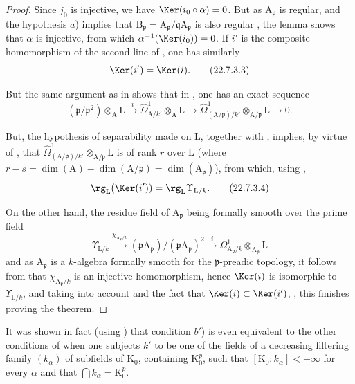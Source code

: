 \begin{proof}
Since $j_0$ is injective, we have $\Ker(i_0\circ\alpha)=0$.
But as $\mathrm{A}_\mathfrak{p}$ is regular, and the hypothesis $a$) implies that $\mathrm{B}_\mathfrak{p}=\mathrm{A}_\mathfrak{p}/\mathfrak{q}\mathrm{A}_\mathfrak{p}$ is also regular , the lemma  shows that $\alpha$ is injective, from which $\alpha^{-1}(\Ker(i_0))=0$.
If $i'$ is the composite homomorphism of the second line of , one has similarly
\[
\label{0.22.7.3.3}
  \Ker(i')=\Ker(i).
  \tag{22.7.3.3}
\]

But the same argument as in  shows that in , one has an exact sequence
\[
  (\mathfrak{p}/\mathfrak{p}^2)\otimes_\mathrm{A}\mathrm{L}\xrightarrow{i}\widehat{\Omega}^1_{\mathrm{A}/k'}\otimes_\mathrm{A}\mathrm{L}\to\widehat{\Omega}^1_{(\mathrm{A}/\mathfrak{p})/k'}\otimes_{\mathrm{A}/\mathfrak{p}}\mathrm{L}\to 0.
\]

But, the hypothesis of separability made on $\mathrm{L}$, together with , implies, by virtue of , that $\widehat{\Omega}^1_{(\mathrm{A}/\mathfrak{p})/k'}\otimes_{\mathrm{A}/\mathfrak{p}}\mathrm{L}$ is of rank $r$ over $\mathrm{L}$ (where $r-s=\dim(\mathrm{A})-\dim(\mathrm{A}/\mathfrak{p})=\dim(\mathrm{A}_\mathfrak{p})$), from which, using ,
\[
\label{0.22.7.3.4}
  \rg_\mathrm{L}(\Ker(i'))=\rg_\mathrm{L}\Upsilon_{\mathrm{L}/k}.
  \tag{22.7.3.4}
\]

On the other hand, the residue field of $\mathrm{A}_\mathfrak{p}$ being formally smooth over the prime field 
\[
  \Upsilon_{\mathrm{L}/k}\xrightarrow{\chi_{\mathrm{A}_\mathfrak{p}/k}}(\mathfrak{p}\mathrm{A}_\mathfrak{p})/(\mathfrak{p}\mathrm{A}_\mathfrak{p})^2\xrightarrow{i}\Omega^1_{\mathrm{A}_\mathfrak{p}/k}\otimes_{\mathrm{A}_\mathfrak{p}}\mathrm{L}
\]
and as $\mathrm{A}_\mathfrak{p}$ is a $k$-algebra formally smooth for the $\mathfrak{p}$-preadic topology, it follows from  that $\chi_{\mathrm{A}_\mathfrak{p}/k}$ is an injective homomorphism, hence $\Ker(i)$ is isomorphic to $\Upsilon_{\mathrm{L}/k}$, and taking into account  and the fact that $\Ker(i)\subset\Ker(i')$, , this finishes proving the theorem.
\end{proof}

\begin{remark}[22.7.4]
\label{0.22.7.4}
It was shown in fact (using ) that condition $b'$) is even equivalent to the other conditions of  when one subjects $k'$ to be one of the fields of a decreasing filtering family $(k_\alpha)$ of subfields of $\mathrm{K}_0$, containing $\mathrm{K}_0^p$, such that $[\mathrm{K}_0:k_\alpha]<+\infty$ for every $\alpha$ and that $\bigcap k_\alpha=\mathrm{K}_0^p$.
\end{remark}

